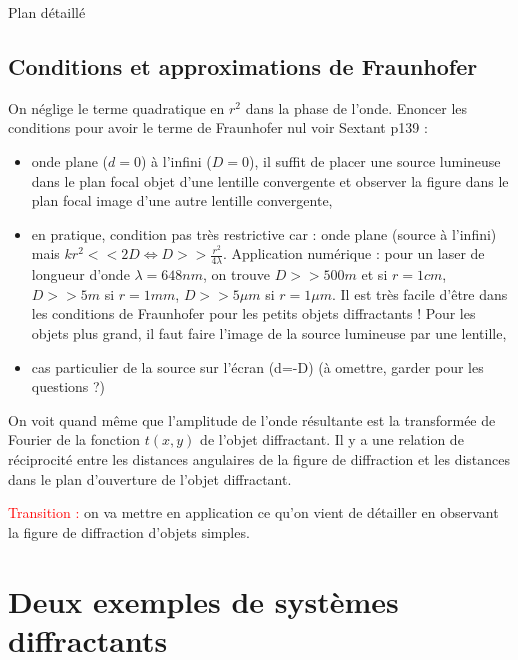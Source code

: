 \begin{reportBlock}{Plan détaillé}
  \subsection{Conditions et approximations de Fraunhofer}
  On néglige le terme quadratique en $r^2$ dans la phase de l'onde. Enoncer les conditions pour avoir le terme de Fraunhofer nul voir Sextant p139 :
  \begin{itemize}
      \item onde plane ($d=0$) à l'infini ($D=0$), il suffit de placer une source lumineuse dans le plan focal objet d'une lentille convergente et observer la figure dans le plan focal image d'une autre lentille convergente,
      \item en pratique, condition pas très restrictive car : onde plane (source à l'infini) mais $kr^2<<2D\Leftrightarrow D>>\frac{r^2}{4\lambda}$. Application numérique : pour un laser de longueur d'onde $\lambda=648nm$, on trouve $D>>500m$ et si $r=1cm$, $D>>5m$ si $r=1mm$, $D>>5\mu m$ si $r=1\mu m$. Il est très facile d'être dans les conditions de Fraunhofer pour les petits objets diffractants ! Pour les objets plus grand, il faut faire l'image de la source lumineuse par une lentille,
      \item cas particulier de la source sur l'écran (d=-D) (à omettre, garder pour les questions ?)
  \end{itemize}
  On voit quand même que l'amplitude de l'onde résultante est la transformée de Fourier de la fonction $t(x,y)$ de l'objet diffractant. Il y a une relation de réciprocité entre les distances angulaires de la figure de diffraction et les distances dans le plan d'ouverture de l'objet diffractant.

  \textcolor{red}{Transition :} on va mettre en application ce qu'on vient de détailler en observant la figure de diffraction d'objets simples.
  \section{Deux exemples de systèmes diffractants}
  

\end{reportBlock}
